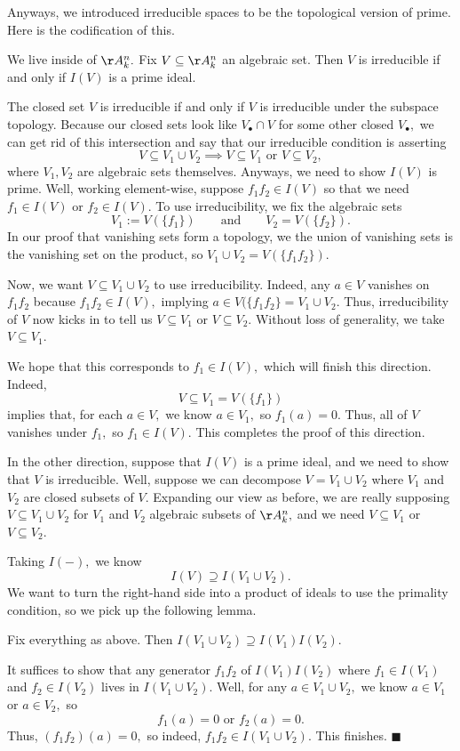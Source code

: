 Anyways, we introduced irreducible spaces to be the topological version of prime. Here is the codification of this.
\begin{proposition}
    We live inside of $\AA_k^n.$ Fix $V\subseteq\AA_k^n$ an algebraic set. Then $V$ is irreducible if and only if $I(V)$ is a prime ideal.
\end{proposition}
The closed set $V$ is irreducible if and only if $V$ is irreducible under the subspace topology. Because our closed sets look like $V_\bullet\cap V$ for some other closed $V_\bullet,$ we can get rid of this intersection and say that our irreducible condition is asserting
\[V\subseteq V_1\cup V_2\implies V\subseteq V_1\text{ or }V\subseteq V_2,\]
where $V_1,V_2$ are algebraic sets themselves. Anyways, we need to show $I(V)$ is prime. Well, working element-wise, suppose $f_1f_2\in I(V)$ so that we need $f_1\in I(V)$ or $f_2\in I(V).$ To use irreducibility, we fix the algebraic sets
\[V_1:=V(\{f_1\})\qquad\text{and}\qquad V_2=V(\{f_2\}).\]
In our proof that vanishing sets form a topology, we the union of vanishing sets is the vanishing set on the product, so $V_1\cup V_2=V(\{f_1f_2\}).$

Now, we want $V\subseteq V_1\cup V_2$ to use irreducibility. Indeed, any $a\in V$ vanishes on $f_1f_2$ because $f_1f_2\in I(V),$ implying $a\in V(\{f_1f_2\}=V_1\cup V_2.$ Thus, irreducibility of $V$ now kicks in to tell us $V\subseteq V_1$ or $V\subseteq V_2.$ Without loss of generality, we take $V\subseteq V_1.$

We hope that this corresponds to $f_1\in I(V),$ which will finish this direction. Indeed,
\[V\subseteq V_1=V(\{f_1\})\]
implies that, for each $a\in V,$ we know $a\in V_1,$ so $f_1(a)=0.$ Thus, all of $V$ vanishes under $f_1,$ so $f_1\in I(V).$ This completes the proof of this direction.

In the other direction, suppose that $I(V)$ is a prime ideal, and we need to show that $V$ is irreducible. Well, suppose we can decompose $V=V_1\cup V_2$ where $V_1$ and $V_2$ are closed subsets of $V.$ Expanding our view as before, we are really supposing $V\subseteq V_1\cup V_2$ for $V_1$ and $V_2$ algebraic subsets of $\AA_k^n,$ and we need $V\subseteq V_1$ or $V\subseteq V_2.$

Taking $I(-),$ we know
\[I(V)\supseteq I(V_1\cup V_2).\]
We want to turn the right-hand side into a product of ideals to use the primality condition, so we pick up the following lemma.
\begin{lemma}
    Fix everything as above. Then $I(V_1\cup V_2)\supseteq I(V_1)I(V_2).$
\end{lemma}
It suffices to show that any generator $f_1f_2$ of $I(V_1)I(V_2)$ where $f_1\in I(V_1)$ and $f_2\in I(V_2)$ lives in $I(V_1\cup V_2).$ Well, for any $a\in V_1\cup V_2,$ we know $a\in V_1$ or $a\in V_2,$ so
\[f_1(a)=0\text{ or }f_2(a)=0.\]
Thus, $(f_1f_2)(a)=0,$ so indeed, $f_1f_2\in I(V_1\cup V_2).$ This finishes. $\blacksquare$

